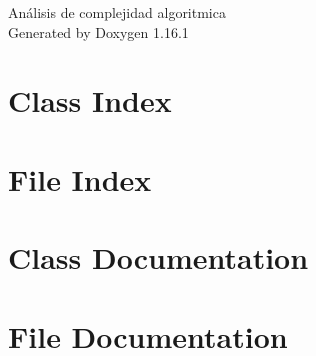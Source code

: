 \documentclass[twoside]{book}
\newcommand{\+}{\discretionary{\mbox{\scriptsize$\hookleftarrow$}}{}{}}
\newcommand{\clearemptydoublepage}{%
    \newpage{\pagestyle{empty}\cleardoublepage}%
  }
\begin{document}
  \raggedbottom
    \hypersetup{pageanchor=false,
                bookmarksnumbered=true,
                pdfencoding=unicode
               }
  \begin{titlepage}
  \vspace*{7cm}
  \begin{center}%
  {\Large Análisis de complejidad algoritmica}\\
  \vspace*{1cm}
  {\large Generated by Doxygen 1.16.1}\\
  \end{center}
  \end{titlepage}
  \clearemptydoublepage
  \tableofcontents
  \clearemptydoublepage
  \hypersetup{pageanchor=true}
\chapter{Class Index}

\chapter{File Index}

\chapter{Class Documentation}

\chapter{File Documentation}






  \backmatter
  \newpage
  \clearemptydoublepage
  \printindex
\end{document}

